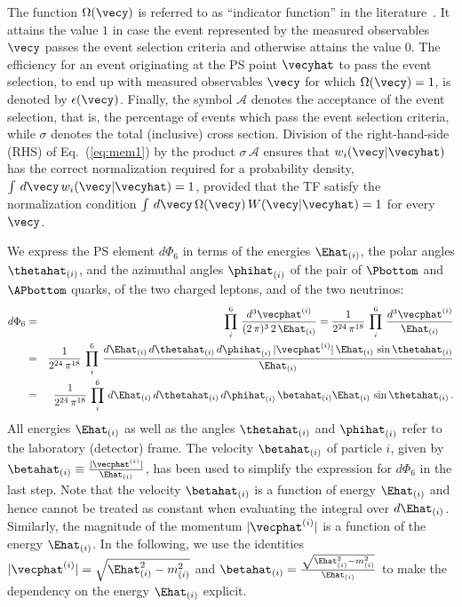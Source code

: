 The function $\Omega(\vecy)$ is referred to as ``indicator function'' in the literature~\cite{Fiedler:2010sg,Volobouev:2011vb}.
It attains the value $1$ in case the event represented by the measured observables $\vecy$ passes the event selection criteria and otherwise attains the value $0$.
The efficiency for an event originating at the PS point
$\vecyhat$ to pass the event selection, \ie to end up with measured
observables $\vecy$ for which $\Omega(\vecy) = 1$,
is denoted by $\epsilon(\vecy)$. 
Finally, the symbol $\mathcal{A}$ denotes the acceptance of the event selection, 
that is, the percentage of events which pass the event selection criteria,
while $\sigma$ denotes the total (inclusive) cross section.
Division of the right-hand-side (RHS) of Eq.~(\ref{eq:mem1}) by the product $\sigma \, \mathcal{A}$
ensures that $w_{i}(\vecy|\vecyhat)$ has the correct normalization required for a probability density, 
\ie $\int \, d\vecy \, w_{i}(\vecy|\vecyhat) = 1$,
provided that the TF satisfy the normalization condition
$\int \, d\vecy \, \Omega(\vecy) \, W(\vecy|\vecyhat) = 1$
for every $\vecy$.

We express the PS element $d\Phi_{6}$ in terms of the energies $\Ehat_{(i)}$, the polar angles $\thetahat_{(i)}$, and the azimuthal angles $\phihat_{(i)}$ 
of the pair of $\Pbottom$ and $\APbottom$ quarks, of the two charged leptons, and of the two neutrinos:
\begin{eqnarray}
d\Phi_{6} 
 & = &\prod_{i}^{6} \, \frac{d^{3}\vecphat^{(i)}}{(2 \, \pi)^{3} \, 2 \, \Ehat_{(i)}} 
  = \frac{1}{2^{24} \, \pi^{18}} \, \prod_{i}^{6} \, 
\frac{d^{3}\vecphat^{(i)}}{\Ehat_{(i)}} \nonumber \\
 & = & \frac{1}{2^{24} \, \pi^{18}} \, \prod_{i}^{6} \, 
\frac{d\Ehat_{(i)} \, d\thetahat_{(i)} \, d\phihat_{(i)} \, |\vecphat^{(i)}| \, \Ehat_{(i)} \, \sin\thetahat_{(i)}}{\Ehat_{(i)}} \nonumber \\
 & = & \frac{1}{2^{24} \, \pi^{18}} \, \prod_{i}^{6} \, 
d\Ehat_{(i)} \, d\thetahat_{(i)} \, d\phihat_{(i)} \, \betahat_{(i)} \Ehat_{(i)} \, \sin\thetahat_{(i)} \, .
\label{eq:PS_inPolarCoordinates}
\end{eqnarray}
All energies $\Ehat_{(i)}$ as well as the angles $\thetahat_{(i)}$ and $\phihat_{(i)}$ refer to the laboratory (detector) frame.
The velocity $\betahat_{(i)}$ of particle $i$,
given by $\betahat_{(i)} \equiv \frac{|\vecphat^{(i)}|}{\Ehat_{(i)}}$,
has been used to simplify the expression for $d\Phi_{6}$ in the last step.
Note that the velocity $\betahat_{(i)}$ is a function of energy $\Ehat_{(i)}$ and hence cannot be treated as constant when evaluating the integral over $d\Ehat_{(i)}$.
Similarly, the magnitude of the momentum $|\vecphat^{(i)}|$ is a function of the energy $\Ehat_{(i)}$.
In the following, we use the identities $|\vecphat^{(i)}| = \sqrt{\Ehat_{(i)}^{2} - m_{(i)}^{2}}$ 
and $\betahat_{(i)} = \frac{\sqrt{\Ehat_{(i)}^{2} - m_{(i)}^{2}}}{\Ehat_{(i)}}$ to make the dependency on the energy $\Ehat_{(i)}$ explicit.

